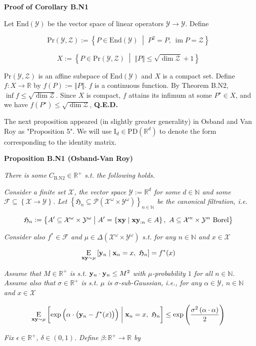 \documentclass[a4paper]{article}
\newcommand{\Co}[1]{}
\newcommand{\AP}[1]{\left(#1\right)}
\newcommand{\AC}[1]{\left\{#1\right\}}
\newcommand{\ABM}[2]{\left[#1\;\middle\vert\;#2\right]}
\newcommand{\ACM}[2]{\left\{#1\;\middle\vert\;#2\right\}}
\newcommand{\CE}[3]{\underset{#1}{\operatorname{E}}\ABM{#2}{#3}}
\newcommand{\PS}[1]{\mathcal{P}\AP{#1}}
\newcommand{\Nats}{\mathbb{N}}
\newcommand{\Reals}{\mathbb{R}}
\newcommand{\Id}{\mathrm{I}}
\newcommand{\PD}{\mathrm{PD}}
\newcommand{\End}{\mathrm{End}}
\DeclareMathOperator{\Img}{im}
\newcommand{\Norm}[1]{\left\Vert #1 \right\Vert}
\newcommand{\X}{\mathcal{X}}
\newcommand{\Y}{\mathcal{Y}}
\newcommand{\Z}{\mathcal{Z}}
\newcommand{\F}{\mathcal{F}}
\begin{document}
\textbf{Proof of Corollary B.N1}\Co{b}

Let $\End(\Y)$ be the vector space of linear operators $\Y\rightarrow\Y$. Define

$$\mathrm{Pr}(\Y,\Z):=\ACM{P\in\End(\Y)}{P^2=P,\ \Img{P}=\Z}$$

$$X:=\ACM{P\in\mathrm{Pr}(\Y,\Z)}{\Norm{P}\leq\sqrt{\dim{\Z}}+1}$$

$\mathrm{Pr}(\Y,\Z)$ is an affine subspace of $\End(\Y)$ and $X$ is a compact set. Define $f:X\rightarrow\Reals$ by $f(P):=\Norm{P}$. $f$ is a continuous function. By Theorem B.N2, $\inf f \leq \sqrt{\dim\Z}$. Since $X$ is compact, $f$ attains its infimum at some $P^\star\in X$, and we have $f\AP{P^\star} \leq \sqrt{\dim\Z}$, \textbf{Q.E.D.}\Co{b}

The next proposition appeared (in slightly greater generality) in Osband and Van Roy as "Proposition 5". We will use $\Id_d\in\PD\AP{\Reals^d}$ to denote the form corresponding to the identity matrix.

\textbf{Proposition B.N1 (Osband-Van Roy)}\Co{b}

\textit{There is some $C_{\mathrm{B.N2}}\in\Reals^+$ s.t. the following holds.}\Co{i}

\textit{Consider a finite set $\X$, the vector space $\Y:=\Reals^d$ for some $d\in\Nats$ and some $\F\subseteq\AC{\X\rightarrow\Y}$. Let $\AC{\mathfrak{H}_n\subseteq\PS{\X^\omega\times\Y^\omega}}_{n\in\Nats}$ be the canonical filtration, i.e.}\Co{i}

$$\mathfrak{H}_n:=\ACM{A'\subseteq\X^\omega\times\Y^\omega}{A'=\ACM{\bold{xy}}{\bold{xy}_{:n}\in A},\ A\subseteq\X^n\times\Y^n\text{ Borel}}$$

\textit{Consider also $f^*\in\F$ and $\mu\in\Delta\AP{\X^\omega\times\Y^\omega}$ s.t. for any $n\in\Nats$ and $x\in\X$}\Co{i}

$$\CE{\bold{xy}\sim\mu}{\bold{y}_n}{\bold{x}_n=x,\ \mathfrak{H}_n} = f^*(x)$$

\textit{Assume that $M\in\Reals^+$ is s.t. $\bold{y}_n\cdot\bold{y}_n\leq M^2$ with $\mu$-probability $1$ for all $n\in\Nats$. Assume also that $\sigma\in\Reals^+$ is s.t. $\mu$ is $\sigma$-sub-Gaussian, i.e., for any $\alpha\in\Y$, $n\in\Nats$ and $x\in\X$}\Co{i}

$$\CE{\bold{xy}\sim\mu}{\exp\AP{\alpha\cdot\AP{\bold{y}_n-f^*(x)}}}{\bold{x}_n=x,\ \mathfrak{H}_n} \leq \exp\AP{\frac{\sigma^2\AP{\alpha\cdot\alpha}}{2}}$$

\textit{Fix $\epsilon\in\Reals^+$, $\delta\in(0,1)$. Define $\beta:\Reals^+\rightarrow\Reals$ by}\Co{i}
\end{document}
